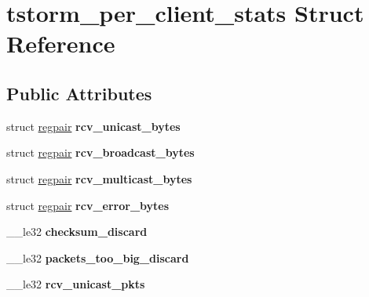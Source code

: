 \hypertarget{structtstorm__per__client__stats}{
\section{tstorm\_\-per\_\-client\_\-stats Struct Reference}
\label{structtstorm__per__client__stats}
}
\subsection*{Public Attributes}
\begin{DoxyCompactItemize}
\item 
\hypertarget{structtstorm__per__client__stats_a5c545b699b00b61f52008a108f528278}{
struct \hyperlink{structregpair}{regpair} {\bfseries rcv\_\-unicast\_\-bytes}}
\label{structtstorm__per__client__stats_a5c545b699b00b61f52008a108f528278}

\item 
\hypertarget{structtstorm__per__client__stats_aacf79c6c05ffe661e3a5b8732fe47ef9}{
struct \hyperlink{structregpair}{regpair} {\bfseries rcv\_\-broadcast\_\-bytes}}
\label{structtstorm__per__client__stats_aacf79c6c05ffe661e3a5b8732fe47ef9}

\item 
\hypertarget{structtstorm__per__client__stats_aa58f673b7dee56ee9538a1b91a90e028}{
struct \hyperlink{structregpair}{regpair} {\bfseries rcv\_\-multicast\_\-bytes}}
\label{structtstorm__per__client__stats_aa58f673b7dee56ee9538a1b91a90e028}

\item 
\hypertarget{structtstorm__per__client__stats_af540b32131bf3e549667ca7badc55992}{
struct \hyperlink{structregpair}{regpair} {\bfseries rcv\_\-error\_\-bytes}}
\label{structtstorm__per__client__stats_af540b32131bf3e549667ca7badc55992}

\item 
\hypertarget{structtstorm__per__client__stats_ab36ed7941552995850d75a1f91d9d03c}{
\_\-\_\-le32 {\bfseries checksum\_\-discard}}
\label{structtstorm__per__client__stats_ab36ed7941552995850d75a1f91d9d03c}

\item 
\hypertarget{structtstorm__per__client__stats_a1b6560b42c358c6713dd41512fa418cd}{
\_\-\_\-le32 {\bfseries packets\_\-too\_\-big\_\-discard}}
\label{structtstorm__per__client__stats_a1b6560b42c358c6713dd41512fa418cd}

\item 
\hypertarget{structtstorm__per__client__stats_ad4ac1adad5c4c3a67759aaa3107461a0}{
\_\-\_\-le32 {\bfseries rcv\_\-unicast\_\-pkts}}
\label{structtstorm__per__client__stats_ad4ac1adad5c4c3a67759aaa3107461a0}


\end{DoxyCompactItemize}
